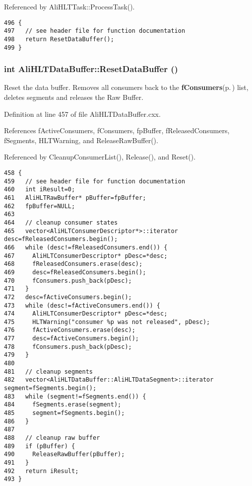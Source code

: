 Referenced by Ali\-HLTTask::Process\-Task().

\footnotesize\begin{verbatim}496 {
497   // see header file for function documentation
498   return ResetDataBuffer();
499 }
\end{verbatim}\normalsize 


\subsubsection{\setlength{\rightskip}{0pt plus 5cm}int Ali\-HLTData\-Buffer::Reset\-Data\-Buffer ()\hspace{0.3cm}{\tt  [private]}}\label{classAliHLTDataBuffer_d1}


Reset the data buffer. Removes all consumers back to the {\bf f\-Consumers}{\rm (p.\,\pageref{classAliHLTDataBuffer_r1})} list, deletes segments and releases the Raw Buffer. 

Definition at line 457 of file Ali\-HLTData\-Buffer.cxx.

References f\-Active\-Consumers, f\-Consumers, fp\-Buffer, f\-Released\-Consumers, f\-Segments, HLTWarning, and Release\-Raw\-Buffer().

Referenced by Cleanup\-Consumer\-List(), Release(), and Reset().

\footnotesize\begin{verbatim}458 {
459   // see header file for function documentation
460   int iResult=0;
461   AliHLTRawBuffer* pBuffer=fpBuffer;
462   fpBuffer=NULL;
463 
464   // cleanup consumer states
465   vector<AliHLTConsumerDescriptor*>::iterator desc=fReleasedConsumers.begin();
466   while (desc!=fReleasedConsumers.end()) {
467     AliHLTConsumerDescriptor* pDesc=*desc;
468     fReleasedConsumers.erase(desc);
469     desc=fReleasedConsumers.begin();
470     fConsumers.push_back(pDesc);
471   }
472   desc=fActiveConsumers.begin();
473   while (desc!=fActiveConsumers.end()) {
474     AliHLTConsumerDescriptor* pDesc=*desc;
475     HLTWarning("consumer %p was not released", pDesc);
476     fActiveConsumers.erase(desc);
477     desc=fActiveConsumers.begin();
478     fConsumers.push_back(pDesc);
479   }
480 
481   // cleanup segments
482   vector<AliHLTDataBuffer::AliHLTDataSegment>::iterator segment=fSegments.begin();
483   while (segment!=fSegments.end()) {
484     fSegments.erase(segment);
485     segment=fSegments.begin();
486   }
487 
488   // cleanup raw buffer
489   if (pBuffer) {
490     ReleaseRawBuffer(pBuffer);
491   }
492   return iResult;
493 }
\end{verbatim}\normalsize 


